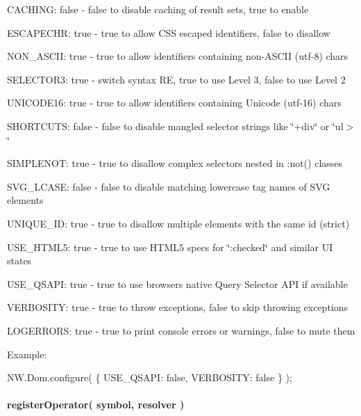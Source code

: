 \begin{DoxyItemize}
\item {\ttfamily C\+A\+C\+H\+I\+NG}\+: false -\/ false to disable caching of result sets, true to enable
\item {\ttfamily E\+S\+C\+A\+P\+E\+C\+HR}\+: true -\/ true to allow C\+SS escaped identifiers, false to disallow
\item {\ttfamily N\+O\+N\+\_\+\+A\+S\+C\+II}\+: true -\/ true to allow identifiers containing non-\/\+A\+S\+C\+II (utf-\/8) chars
\item {\ttfamily S\+E\+L\+E\+C\+T\+O\+R3}\+: true -\/ switch syntax RE, true to use Level 3, false to use Level 2
\item {\ttfamily U\+N\+I\+C\+O\+D\+E16}\+: true -\/ true to allow identifiers containing Unicode (utf-\/16) chars
\item {\ttfamily S\+H\+O\+R\+T\+C\+U\+TS}\+: false -\/ false to disable mangled selector strings like \char`\"{}+div\char`\"{} or \char`\"{}ul$>$\char`\"{}
\item {\ttfamily S\+I\+M\+P\+L\+E\+N\+OT}\+: true -\/ true to disallow complex selectors nested in \textquotesingle{}\+:not()\textquotesingle{} classes
\item {\ttfamily S\+V\+G\+\_\+\+L\+C\+A\+SE}\+: false -\/ false to disable matching lowercase tag names of S\+VG elements
\item {\ttfamily U\+N\+I\+Q\+U\+E\+\_\+\+ID}\+: true -\/ true to disallow multiple elements with the same id (strict)
\item {\ttfamily U\+S\+E\+\_\+\+H\+T\+M\+L5}\+: true -\/ true to use H\+T\+M\+L5 specs for \char`\"{}\+:checked\char`\"{} and similar UI states
\item {\ttfamily U\+S\+E\+\_\+\+Q\+S\+A\+PI}\+: true -\/ true to use browsers native Query Selector A\+PI if available
\item {\ttfamily V\+E\+R\+B\+O\+S\+I\+TY}\+: true -\/ true to throw exceptions, false to skip throwing exceptions
\item {\ttfamily L\+O\+G\+E\+R\+R\+O\+RS}\+: true -\/ true to print console errors or warnings, false to mute them
\end{DoxyItemize}

Example\+:


\begin{DoxyCode}
NW.Dom.configure( \{ USE\_QSAPI: false, VERBOSITY: false \} );
\end{DoxyCode}


\paragraph*{{\ttfamily register\+Operator( symbol, resolver )}}


